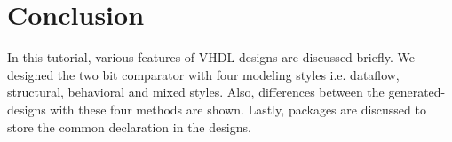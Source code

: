 \section{Conclusion}
In this tutorial, various features of VHDL designs are discussed briefly. We designed the two bit comparator with four modeling styles i.e. dataflow, structural, behavioral and mixed styles. Also, differences between the generated-designs with these four methods are shown. Lastly, packages are discussed to store the common declaration in the designs. 
